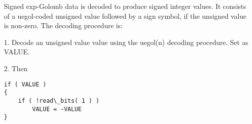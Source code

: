 Signed exp-Golomb data is decoded to produce signed integer values. It
consists of a uegol-coded unsigned value followed by a sign symbol, if
the unsigned value is non-zero. The decoding procedure is:

1. Decode an unsigned value value using the uegol(n) decoding procedure.
Set as VALUE.

2. Then
\begin{verbatim}
if ( VALUE )
{
    if ( !read\_bits( 1 ) )
        VALUE = -VALUE
}
\end{verbatim}
